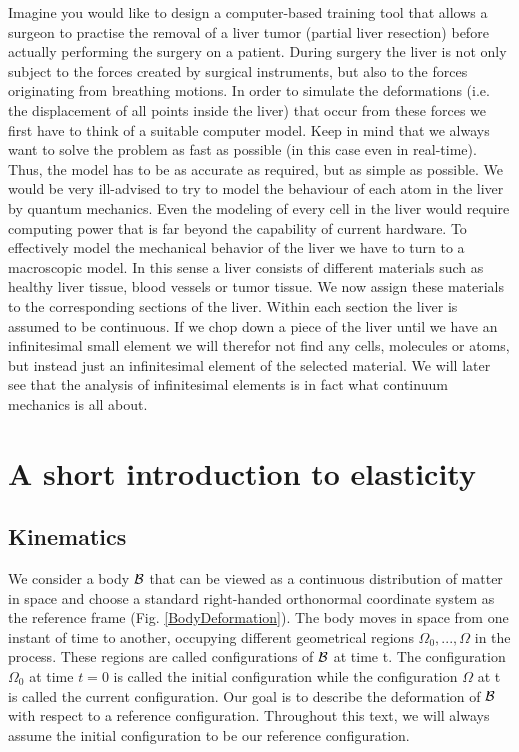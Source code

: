 Imagine you would like to design a computer-based training tool that allows a surgeon to practise the removal of a liver tumor (partial liver resection) before actually performing the surgery on a patient. During surgery the liver is not only subject to the forces created by surgical instruments, but also to the forces originating from breathing motions. In order to simulate the deformations (i.e. the displacement of all points inside the liver) that occur from these forces we first have to think of a suitable computer model. Keep in mind that we always want to solve the problem as fast as possible (in this case even in real-time). Thus, the model has to be as accurate as required, but as simple as possible. We would be very ill-advised to try to model the behaviour of each atom in the liver by quantum mechanics. Even the modeling of every cell in the liver would require computing power that is far beyond the capability of current hardware. To effectively model the mechanical behavior of the liver we have to turn to a macroscopic model. In this sense a liver consists of different materials such as healthy liver tissue, blood vessels or tumor tissue. We now assign these materials to the corresponding sections of the liver. Within each section the liver is assumed to be continuous. If we chop down a piece of the liver until we have an infinitesimal small element we will therefor not find any cells, molecules or atoms, but instead just an infinitesimal element of the selected material. We will later see that the analysis of infinitesimal elements is in fact what continuum mechanics is all about. 


\section{A short introduction to elasticity}
\subsection{Kinematics}
We consider a body $\mathcal{B} $ that can be viewed as a continuous distribution of matter in space and choose a standard right-handed orthonormal coordinate system as the reference frame (Fig. \ref{BodyDeformation}). The body moves in space from one instant of time to another, occupying different geometrical regions $\Omega_0, ..., \Omega$ in the process. These regions are called configurations of $\mathcal{B} $ at time t. The configuration $\Omega_0$ at time $t=0$ is called the initial configuration while the configuration $\Omega$ at t is called the current configuration. Our goal is to describe the deformation of $\mathcal{B} $ with respect to a reference configuration. Throughout this text, we will always assume the initial configuration to be our reference configuration. 


